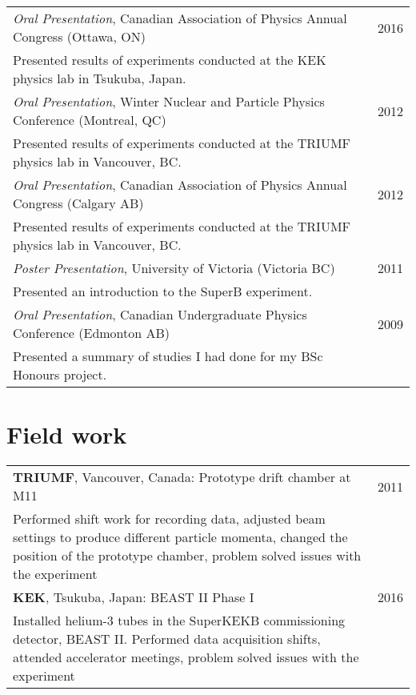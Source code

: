 \documentclass{article}
\begin{document}
\begin{tabular}{p{14cm}l}
 \textit{Oral Presentation}, Canadian Association of Physics Annual Congress (Ottawa, ON) & 2016\\ \footnotesize{Presented results of experiments conducted at the KEK physics lab in Tsukuba, Japan.} &\smallskip\\

 \textit{Oral Presentation}, Winter Nuclear and Particle Physics Conference (Montreal, QC) & 2012\\ \footnotesize{Presented results of experiments conducted at the TRIUMF physics lab in Vancouver, BC.} & \smallskip\\

 \textit{Oral Presentation}, Canadian Association of Physics Annual Congress (Calgary AB)& 2012\\ \footnotesize{Presented results of experiments conducted at the TRIUMF physics lab in Vancouver, BC.} & \smallskip\\

\textit{Poster Presentation}, University of Victoria (Victoria BC) & 2011 \\ \footnotesize{Presented an introduction to the SuperB experiment.} &\smallskip \\

 \textit{Oral Presentation}, Canadian Undergraduate Physics Conference (Edmonton AB)& 2009\\ \footnotesize{Presented a summary of studies I had done for my BSc Honours project.} & \smallskip\\
\end{tabular}

\section{Field work}

\begin{tabular}{p{14cm}l}
 \textbf{TRIUMF}, Vancouver, Canada: Prototype drift chamber at M11 & 2011\\ \footnotesize{Performed shift work for recording data, adjusted beam settings to produce different particle momenta, changed the position of the prototype chamber, problem solved issues with the experiment} &\smallskip\\

 \textbf{KEK}, Tsukuba, Japan: BEAST II Phase I & 2016\\ \footnotesize{Installed helium-3 tubes in the SuperKEKB commissioning detector, BEAST II. Performed data acquisition shifts, attended accelerator meetings, problem solved issues with the experiment} &\smallskip\\


\end{tabular}
\end{document}
